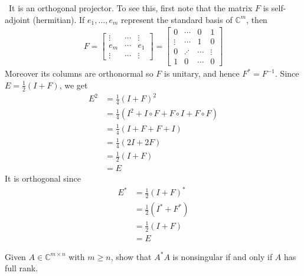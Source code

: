 \documentclass[12pt]{article}
\newenvironment{ex}[2][Exercise]{\begin{trivlist}
		\item[\hskip \labelsep {\bfseries #1}\hskip \labelsep {\bfseries #2.}]}{\end{trivlist}}
\newenvironment{sol}[1][Solution]{\begin{trivlist}
		\item[\hskip \labelsep {\bfseries #1:}]}{\end{trivlist}}
\begin{document}
\begin{sol}
	\
	It is an orthogonal projector. To see this, first note that the matrix $F$ is self-adjoint (hermitian).
	If $e_1,\ldots,e_m$ represent the standard basis of $\mathbb{C}^m$, then
	\begin{align*}
		F=\begin{bmatrix}
			\vdots & \cdots & \vdots\\
			e_m & \cdots & e_1\\
			\vdots & \cdots & \vdots
		\end{bmatrix}
		=\begin{bmatrix}
			0  & \cdots & 0 & 1\\
			\vdots & \cdots & 1 & 0\\
			0 & \iddots & \cdots &\vdots\\
			1 & 0 & \cdots & 0
		\end{bmatrix}
	\end{align*}
	Moreover its columns are orthonormal so $F$ is unitary, and hence $F^*=F^{-1}$. Since $E=\frac{1}{2}(I+F)$,
	we get
	\begin{align*}
		E^2&=\frac{1}{4}(I+F)^2\\
		&=\frac{1}{4}(I^2+I\circ F+F\circ I+F\circ F)\\
		&=\frac{1}{4}(I+F+F+I)\\
		&=\frac{1}{4}(2I+2F)\\
		&=\frac{1}{2}(I+F)\\
		&=E
	\end{align*}
	It is orthogonal since
	\begin{align*}
		E^*&=\frac{1}{2}(I+F)^*\\
		&=\frac{1}{2}(I^*+F^*)\\
		&=\frac{1}{2}(I+F)\\
		&=E
	\end{align*}
\end{sol}

\begin{ex}{3}
	Given $A\in\mathbb{C}^{m\times n}$ with $m\geq n$, show that $A^*A$ is nonsingular if and only if $A$
	has full rank.
\end{ex}
\end{document}
